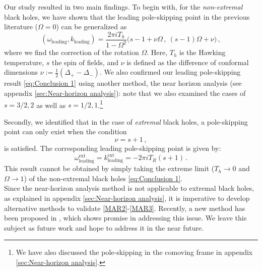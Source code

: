 \documentclass[11pt,a4paper]{article}
\begin{document}
Our study resulted in two main findings.
To begin with, for the \textit{non-extremal} black holes, we have shown that the leading pole-skipping point in the previous literature ($\Omega=0$) can be generalized as 
\begin{equation} \label{eq:Conclusion 1}
    (\omega_{\text{leading}}, k_{\text{leading}})=\frac{2\pi i T_h}{1-\Omega^2}\bigg( s-1 + \nu \Omega\,,~ (s-1)\Omega + \nu \bigg)\,,
\end{equation}
where we find the correction of the rotation $\Omega$. Here, $T_h$ is the Hawking temperature, $s$ the spin of fields, and $\nu$ is defined as the difference of conformal dimensions $\nu := \frac{1}{2}(\Delta_+ - \Delta_-)$.
We also confirmed our leading pole-skipping result \eqref{eq:Conclusion 1} using another method, the near horizon analysis (see appendix \ref{sec:Near-horizon analysis}): note that we also examined the cases of $s=3/2, 2$ as well as $s=1/2, 1$.\footnote{We have also discussed the pole-skipping in the comoving frame in appendix \ref{sec:Near-horizon analysis}.}

Secondly, we identified that in the case of \textit{extremal} black holes, a pole-skipping point can only exist when the condition
\begin{equation}\label{MAR2}
    \nu = s+1 \,,
\end{equation}
is satisfied. The corresponding leading pole-skipping point is given by:
\begin{equation}\label{MAR3}
    \omega^{\text{ext}}_{\text{leading}} = k^{\text{ext}}_{\text{leading}} = 
    - 2\pi i T_R (s+1)\,.
\end{equation}
This result cannot be obtained by simply taking the extreme limit ($T_h\rightarrow 0$ and $\Omega\rightarrow 1$) of the non-extremal black holes \eqref{eq:Conclusion 1}.\\

Since the near-horizon analysis method is not applicable to extremal black holes, as explained in appendix \ref{sec:Near-horizon analysis}, it is imperative to develop alternative methods to validate \eqref{MAR2}-\eqref{MAR3}. Recently, a new method has been proposed in \cite{Natsuume:2023lzy}, which shows promise in addressing this issue. We leave this subject as future work and hope to address it in the near future.
\end{document}
